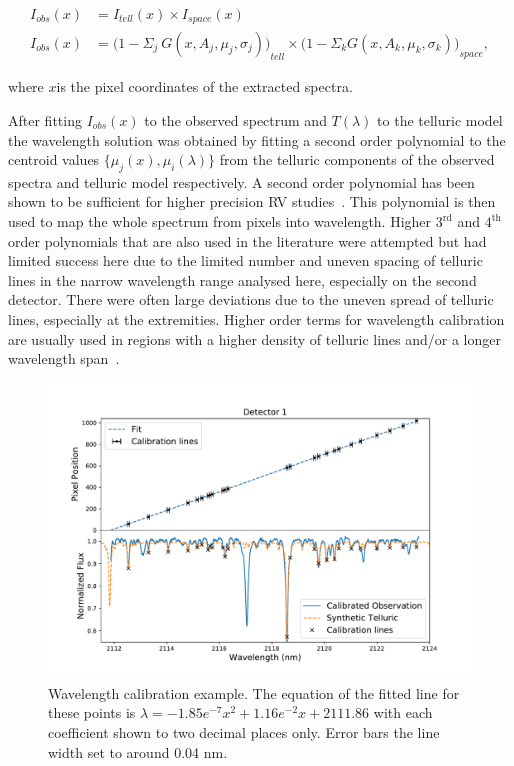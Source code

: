 \begin{align}
I_{obs}(x) &= {I}_{tell}(x) \times {I}_{space}(x) \nonumber \\
I_{obs}(x) &= {\Big(1 - {\Sigma}_{j}\ G(x, A_{j}, {\mu}_{j}, {\sigma}_{j})\Big)}_{tell} \times {\Big(1 - {\Sigma}_{k} G(x, A_{k}, {\mu}_{k}, {\sigma}_{k})\Big)}_{space}, \label{eqn:obs}
\end{align}

where \(x\)is the pixel coordinates of the extracted spectra.


After fitting \(I_{obs}(x)\) to the observed spectrum and \(T(\lambda)\) to the telluric model the wavelength solution was obtained by fitting a second order polynomial to the centroid values \(\{\mu_{j}(x), \mu_{i}(\lambda)\}\) from the telluric components of the observed spectra and telluric model respectively. A second order polynomial has been shown to be sufficient for higher precision {RV} studies~\citep[e.g.][]{bean_groundbased_2010, figueira_radial_2010}. This polynomial is then used to map the whole spectrum from pixels into wavelength. Higher \(3^{\textrm{rd}}\) and \(4^{\textrm{th}}\) order polynomials that are also used in the literature \citep[e.g.][]{seifahrt_synthesising_2010, ulmer-moll_telluric_2018} were attempted but had limited success here due to the limited number and uneven spacing of telluric lines in the narrow wavelength range analysed here, especially on the second detector. There were often large deviations due to the uneven spread of telluric lines, especially at the extremities. Higher order terms for wavelength calibration are usually used in regions with a higher density of telluric lines and/or a longer wavelength span~\citep{piskorz_evidence_2016, seifahrt_synthesising_2010, ulmer-moll_telluric_2018}.


\begin{figure}
    \centering
    \includegraphics[width=0.8\linewidth]{figures/reduction/calibration.pdf}
    \caption{Wavelength calibration example.
    The equation of the fitted line for these points is $\lambda = -1.85e^{-7} x^2 + 1.16e^{-2} x + 2111.86$ with each coefficient shown to two decimal places only. Error bars the line width set to around 0.04 nm.}
    \label{fig:wl_calibration}
\end{figure}

